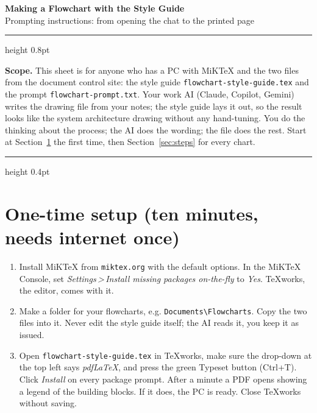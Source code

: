 \documentclass[10pt]{article}
\newcommand{\menu}[1]{\textit{#1}}
\newcommand{\gt}{\,\textgreater\,}
\newcommand{\file}[1]{\texttt{#1}}
\begin{document}
\begin{center}
{\Large\bfseries Making a Flowchart with the Style Guide}\\[2pt]
{\normalsize Prompting instructions: from opening the chat to the printed page}
\end{center}
\vspace{2pt}\hrule height 0.8pt \vspace{6pt}

\textbf{Scope.} This sheet is for anyone who has a PC with MiKTeX and the two files from the document control site: the style guide \file{flowchart-style-guide.tex} and the prompt \file{flowchart-prompt.txt}. Your work AI (Claude, Copilot, Gemini) writes the drawing file from your notes; the style guide lays it out, so the result looks like the system architecture drawing without any hand-tuning. You do the thinking about the process; the AI does the wording; the file does the rest. Start at Section~\ref{sec:setup} the first time, then Section~\ref{sec:steps} for every chart.

\vspace{4pt}\hrule height 0.4pt

\section{One-time setup (ten minutes, needs internet once)}\label{sec:setup}
\begin{enumerate}
\item Install MiKTeX from \file{miktex.org} with the default options. In the MiKTeX Console, set \menu{Settings\gt Install missing packages on-the-fly} to \emph{Yes}. TeXworks, the editor, comes with it.
\item Make a folder for your flowcharts, e.g. \file{Documents\textbackslash Flowcharts}. Copy the two files into it. Never edit the style guide itself; the AI reads it, you keep it as issued.
\item Open \file{flowchart-style-guide.tex} in TeXworks, make sure the drop-down at the top left says \emph{pdfLaTeX}, and press the green Typeset button (Ctrl+T). Click \emph{Install} on every package prompt. After a minute a PDF opens showing a legend of the building blocks. If it does, the PC is ready. Close TeXworks without saving.
\end{enumerate}
\end{document}
